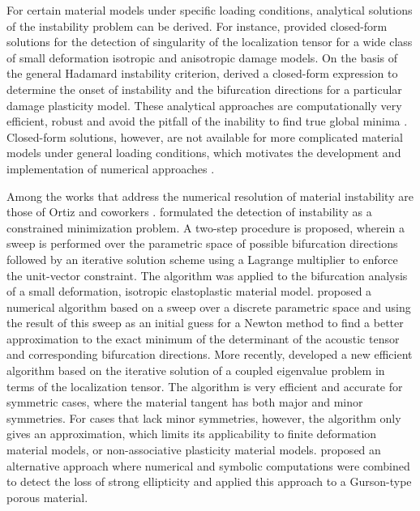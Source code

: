 \documentclass[12pt]{article}
\numberwithin{equation}{section}
\begin{document}
For certain material models under specific loading conditions,
analytical solutions of the instability problem can be derived. For
instance, \citet{Oliver.Huespe:2004} provided closed-form solutions
for the detection of singularity of the localization tensor for a wide
class of small deformation isotropic and anisotropic damage models. On
the basis of the general Hadamard instability criterion,
\citet{Xue.Belytschko:2010} derived a closed-form expression to
determine the onset of instability and the bifurcation directions for
a particular damage plasticity model. These analytical approaches are
computationally very efficient, robust and avoid the pitfall of the
inability to find true global minima \cite{Oliver.etal:2010}.
Closed-form solutions, however, are not available for more complicated
material models under general loading conditions, which motivates the
development and implementation of numerical approaches
\cite{Mosler:2005}.

Among the works that address the numerical resolution of material
instability are those of Ortiz and coworkers \cite{Ortiz:1987,
  Ortiz.etal:1987}.  \citet{Ortiz.etal:1987} formulated the detection
of instability as a constrained minimization problem. A two-step
procedure is proposed, wherein a sweep is performed over the
parametric space of possible bifurcation directions followed by an
iterative solution scheme using a Lagrange multiplier to enforce the
unit-vector constraint. The algorithm was applied to the bifurcation
analysis of a small deformation, isotropic elastoplastic material
model.  \citet{Mosler:2005} proposed a numerical algorithm based on a
sweep over a discrete parametric space and using the result of this
sweep as an initial guess for a Newton method to find a better
approximation to the exact minimum of the determinant of the acoustic
tensor and corresponding bifurcation directions. More recently,
\citet{Oliver.etal:2010} developed a new efficient algorithm based on
the iterative solution of a coupled eigenvalue problem in terms of the
localization tensor. The algorithm is very efficient and accurate for
symmetric cases, where the material tangent has both major and minor
symmetries. For cases that lack minor symmetries, however, the
algorithm only gives an approximation, which limits its applicability
to finite deformation material models, or non-associative plasticity
material models. \citet{Boussaa-Aravas:2001} proposed an alternative
approach where numerical and symbolic computations were combined to
detect the loss of strong ellipticity and applied this approach to a
Gurson-type porous material.
\end{document}
